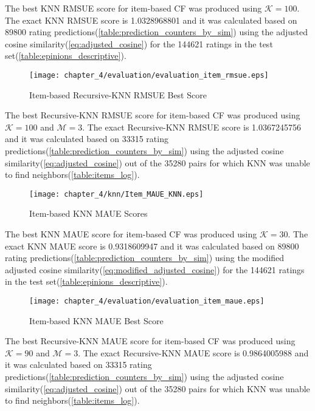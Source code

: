The best KNN RMSUE score for item-based CF was produced using $\mathcal{K}=100$.
The exact KNN RMSUE score is 1.0328968801 and it was calculated based on 89800 rating predictions(\autoref{table:prediction_counters_by_sim})
using the adjusted cosine similarity(\autoref{eq:adjusted_cosine})
for the 144621 ratings in the test set(\autoref{table:epinions_descriptive}).

\begin{figure}[H]
\centering
\texttt{[image: chapter\_4/evaluation/evaluation\_item\_rmsue.eps]}
\caption{Item-based Recursive-KNN RMSUE Best Score}
\label{figure:Item_rknn_rmsue}
\end{figure}

The best Recursive-KNN RMSUE score for item-based CF was produced using $\mathcal{K}=100$ and $\mathcal{M}=3$.
The exact Recursive-KNN RMSUE score is 1.0367245756 and it was calculated based on 33315 rating predictions(\autoref{table:prediction_counters_by_sim})
using the adjusted cosine similarity(\autoref{eq:adjusted_cosine})
out of the 35280 pairs for which KNN was unable to find neighbors(\autoref{table:items_log}).

\begin{figure}[H]
\centering
\texttt{[image: chapter\_4/knn/Item\_MAUE\_KNN.eps]}
\caption{Item-based KNN MAUE Scores}
\label{figure:Item_knn_maue}
\end{figure}

The best KNN MAUE score for item-based CF was produced using $\mathcal{K}=30$.
The exact KNN MAUE score is 0.9318609947 and it was calculated based on 89800 rating predictions(\autoref{table:prediction_counters_by_sim})
using the modified adjusted cosine similarity(\autoref{eq:modified_adjusted_cosine})
for the 144621 ratings in the test set(\autoref{table:epinions_descriptive}).

\begin{figure}[H]
\centering
\texttt{[image: chapter\_4/evaluation/evaluation\_item\_maue.eps]}
\caption{Item-based KNN MAUE Best Score}
\label{figure:Item_rknn_maue}
\end{figure}

The best Recursive-KNN MAUE score for item-based CF was produced using $\mathcal{K}=90$ and $\mathcal{M}=3$.
The exact Recursive-KNN MAUE score is 0.9864005988 and it was calculated based on 33315 rating predictions(\autoref{table:prediction_counters_by_sim})
using the adjusted cosine similarity(\autoref{eq:adjusted_cosine})
out of the 35280 pairs for which KNN was unable to find neighbors(\autoref{table:items_log}).

